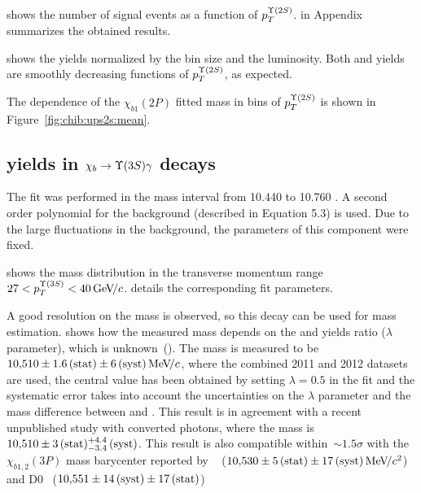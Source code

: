 

 shows the number of signal events as a function
of $p_T^{\Y2S}$.  in Appendix summarizes the
obtained results.



 shows the yields normalized by the bin
size and the luminosity. Both \chibTwoP and \chibThreeP yields are smoothly
decreasing functions of $p_T^{\Y2S}$, as expected.

The dependence of the $\chi_{b1}(2P)$ fitted mass in bins of $p_T^{\Y2S}$ is
shown in Figure~\ref{fig:chib:ups2s:mean}.


\subsection{\texorpdfstring{\chib}{xb} yields in
    \texorpdfstring{$\chib \to \Y3S \gamma$}{xb --> Y(3S) gamma} decays}
\label{sec:chib:ups3s:fit}

The fit was performed in the mass interval from  10.440 to 10.760 \gevcc. 
A second order polynomial for the background (described in Equation 5.3) is used.
Due to the large fluctuations in the background, the
parameters of this component were fixed.


 shows the mass distribution in the
transverse momentum range $27<p_T^{\Y3S}<40\gevc$.
 details the corresponding fit parameters.




A good resolution on the \chiboneThreeP mass is observed, so this decay can be
used for \chiboneThreeP mass estimation.  shows how the
measured \chiboneThreeP mass depends on the \chiboneThreeP and \chibtwoThreeP
yields ratio ($\lambda$ parameter), which is unknown~().
The \chiboneThreeP mass is measured to be $10{,}510 \pm
1.6\mathrm{\,(stat)} \pm 6\mathrm{\,(syst)} {\mathrm{\,Me\kern -0.1em V\!/}c}$, where the combined 2011 and 2012 datasets are used, 
the central value has been obtained by setting $\lambda = 0.5$ in the fit and the 
systematic error takes into account the uncertainties on  
the $\lambda$ parameter and the mass difference between \chiboneThreeP and \chibtwoThreeP. 
This result is in agreement with a recent unpublished
\lhcb study with converted photons, where the \chiboneThreeP mass is
$10{,}510 \pm 3\mathrm{\,(stat)}{}^{+4.4}_{-3.4}\mathrm{\,(syst)}$. This result is also compatible within~$\sim{}1.5\sigma$ with 
the $\chi_{b1,2}(3P)$ mass barycenter reported by \atlas~\cite{Aad:2011ih} ($10{,}530 \pm 5\mathrm{\,(stat)}
\pm 17\mathrm{\,(syst)} {\mathrm{\,Me\kern -0.1em V\!/}c^2}$) and D0~\cite{Abazov:2012gh}  ($10{,}551 \pm 14\mathrm{\,(syst)} \pm 17\mathrm{\,(stat)}$)



% 



